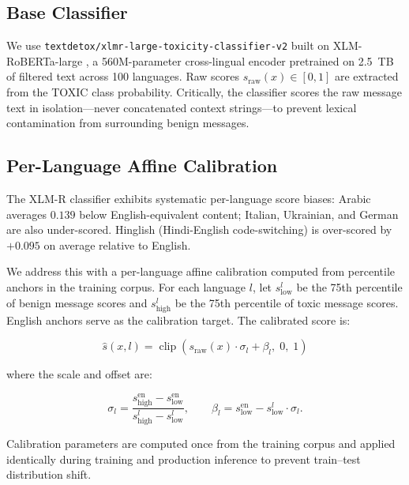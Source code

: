 \documentclass[journal]{IEEEtran}
\begin{document}
\subsection{Base Classifier}

We use \texttt{textdetox/xlmr-large-toxicity-classifier-v2} \cite{dementieva2023} built
on XLM-RoBERTa-large \cite{conneau2020}, a 560M-parameter cross-lingual encoder pretrained
on 2.5~TB of filtered text across 100 languages. Raw scores $s_{\text{raw}}(x) \in [0,1]$
are extracted from the TOXIC class probability. Critically, the classifier scores the
raw message text in isolation---never concatenated context strings---to prevent
lexical contamination from surrounding benign messages.

\subsection{Per-Language Affine Calibration}

The XLM-R classifier exhibits systematic per-language score biases: Arabic averages
$0.139$ below English-equivalent content; Italian, Ukrainian, and German are also
under-scored. Hinglish (Hindi-English code-switching) is over-scored by $+0.095$ on
average relative to English.

We address this with a per-language affine calibration computed from percentile anchors
in the training corpus. For each language $l$, let $s^l_{\text{low}}$ be the 75th
percentile of benign message scores and $s^l_{\text{high}}$ be the 75th percentile of
toxic message scores. English anchors serve as the calibration target. The calibrated
score is:

\begin{equation}\label{eq:calibration}
  \hat{s}(x, l) = \operatorname{clip}\!\left(s_{\text{raw}}(x) \cdot \sigma_l + \beta_l,\;
                                              0,\; 1\right)
\end{equation}

where the scale and offset are:

\begin{equation}\label{eq:cal_params}
  \sigma_l = \frac{s^{\text{en}}_{\text{high}} - s^{\text{en}}_{\text{low}}}
                  {s^l_{\text{high}} - s^l_{\text{low}}}, \qquad
  \beta_l = s^{\text{en}}_{\text{low}} - s^l_{\text{low}} \cdot \sigma_l.
\end{equation}

Calibration parameters are computed once from the training corpus and applied identically
during training and production inference to prevent train--test distribution shift.
\end{document}
